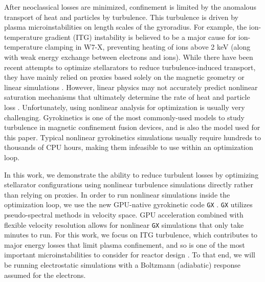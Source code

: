 \documentclass{jpp}
\begin{document}
After neoclassical losses are minimized, confinement is limited by the anomalous transport of heat and particles by turbulence. This turbulence is driven by plasma microinstabilities on length scales of the gyroradius. For example, the ion-temperature gradient (ITG) instability is believed to be a major cause for ion-temperature clamping in W7-X, preventing heating of ions above 2 keV \citep{Beurskens2021IonPlasmas} (along with weak energy exchange between electrons and ions). While there have been recent attempts to optimize stellarators to reduce turbulence-induced transport, they have mainly relied on proxies based solely on the magnetic geometry \citep{Mynick2010OptimizingTransport, Proll2016TEMStellarators, Roberg-Clark2022ReductionOptimization} or linear simulations \citep{Jorge2023DirectDevices}. However, linear physics may not accurately predict nonlinear saturation mechanisms that ultimately determine the rate of heat and particle loss \citep{McKinney2019AQuasi-axisymmetricstellarator}. Unfortunately, using nonlinear analysis for optimization is usually very challenging. Gyrokinetics \citep{AntonsenJr.1980KineticPlasmas, Catto1978LinearizedGyro-kinetics, Frieman1982NonlinearEquilibria} is one of the most commonly-used models to study turbulence in magnetic confinement fusion devices, and is also the model used for this paper. Typical nonlinear gyrokinetics simulations usually require hundreds to thousands of CPU hours, making them infeasible to use within an optimization loop.

In this work, we demonstrate the ability to reduce turbulent losses by optimizing stellarator configurations using nonlinear turbulence simulations directly rather than  relying on proxies. In order to run nonlinear simulations inside the optimization loop, we use the new GPU-native gyrokinetic code {\tt GX} \citep{Mandell2018Laguerre-HermiteGyrokinetics,Mandell2022GX:Design}. {\tt GX} utilizes pseudo-spectral methods in velocity space. GPU acceleration combined with flexible velocity resolution allows for nonlinear {\tt GX} simulations that only take minutes to run. For this work, we focus on ITG turbulence, which contributes to major energy losses that limit plasma confinement, and so is one of the most important microinstabilities to consider for reactor design \citep{Kotschenreuther1995ComparisonInstabilities,Horton1999DriftTransport, Helander2013CollisionlessModes}. To that end, we will be running  electrostatic simulations with a Boltzmann (adiabatic) response assumed for the electrons.
\end{document}
